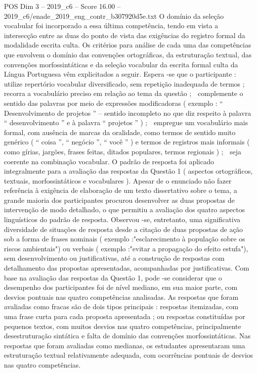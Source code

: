 \begin{textsample}{POS Dim 3 – 2019\_c6 – Score 16.00 – 2019\_c6/enade\_2019\_eng\_contr\_b307920d5e.txt}
O domínio da seleção vocabular foi incorporado a essa última competência, tendo em vista a intersecção entre as duas do ponto de vista das exigências do registro formal da modalidade escrita culta.
Os critérios para análise de cada uma das competências que envolvem o domínio das convenções ortográficas, da estruturação textual, das convenções morfossintáticas e da seleção vocabular da escrita formal culta da Língua Portuguesa vêm explicitados a seguir.
Espera -se que o participante :  utilize repertório vocabular diversificado, sem repetição inadequada de termos ;  recorra a vocabulário preciso em relação ao tema da questão ;  complemente o sentido das palavras por meio de expressões modificadoras ( exemplo : “ Desenvolvimento de projetos ” – sentido incompleto no que diz respeito à palavra “ desenvolvimento ” e à palavra “ projetos ” ) ;  empregue um vocabulário mais formal, com ausência de marcas da oralidade, como termos de sentido muito genérico ( “ coisa ”, “ negócio ”, “ você ” ) e termos de registros mais informais ( como gírias, jargões, frases feitas, ditados populares, termos regionais ) ;  seja coerente na combinação vocabular.
O padrão de resposta foi aplicado integralmente para a avaliação das respostas da Questão 1 ( aspectos ortográficos, textuais, morfossintáticos e vocabulares ).
Apesar de o enunciado não fazer referência à exigência de elaboração de um texto dissertativo sobre o tema, a grande maioria dos participantes procurou desenvolver as duas propostas de intervenção de modo detalhado, o que permitiu a avaliação dos quatro aspectos linguísticos do padrão de resposta.
Observou -se, entretanto, uma significativa diversidade de situações de resposta desde a citação de duas propostas de ação sob a forma de frases nominais ( exemplo :"esclarecimento à população sobre os riscos ambientais") ou verbais ( exemplo :"evitar a propagação do efeito estufa"), sem desenvolvimento ou justificativas, até a construção de respostas com detalhamento das propostas apresentadas, acompanhadas por justificativas.
Com base na avaliação das respostas da Questão 1, pode -se considerar que o desempenho dos participantes foi de nível mediano, em sua maior parte, com desvios pontuais nas quatro competências analisadas.
As respostas que foram avaliadas como fracas são de dois tipos principais : respostas itemizadas, com uma frase curta para cada proposta apresentada ; ou respostas constituídas por pequenos textos, com muitos desvios nas quatro competências, principalmente desestruturação sintática e falta de domínio das convenções morfossintáticas.
Nas respostas que foram avaliadas como medianas, os estudantes apresentaram uma estruturação textual relativamente adequada, com ocorrências pontuais de desvios nas quatro competências.

\end{textsample}
